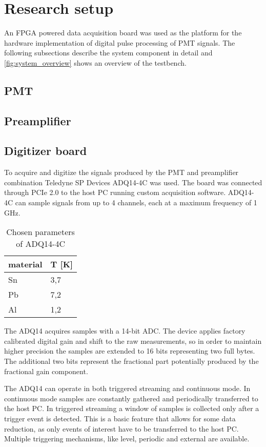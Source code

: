 \section{Research setup}
An FPGA powered data acquisition board was used as the platform 
for the hardware implementation of digital pulse processing of PMT
signals.
The following subsections describe the system component in detail and
\autoref{fig:system_overview} shows an overview of the testbench.
\subsection{PMT}
\subsection{Preamplifier}
\subsection{Digitizer board}
To acquire and digitize the signals produced by the PMT and preamplifier
combination Teledyne SP Devices ADQ14-4C was used. The board was connected
through PCIe 2.0 to the host PC running custom acquisition software.
ADQ14-4C can sample signals from up to 4 channels, each at a maximum
frequency of 1 GHz. 
\begin{table}[H]
\caption{Chosen parameters of ADQ14-4C}
\centering
  \begin{tabular}{l l}
    material  & T [K]\\
    \hline
    Sn                     & 3,7 \\
    Pb                     & 7,2 \\
    Al                     & 1,2\\
  \end{tabular}
  \label{tab:adq14_datasheet}
\end{table}


The ADQ14 acquires samples with a 14-bit ADC.
The device applies factory calibrated digital gain and shift
to the raw measurements, 
so in order to maintain higher precision the samples are 
extended to 16 bits representing two full bytes. 
The additional two bits represent the fractional part potentially
produced by the fractional gain component.


The ADQ14 can operate in both triggered streaming and continuous mode.
In continuous mode samples are constantly gathered and periodically
transferred to the host PC. In triggered streaming a window of samples is 
collected only after a trigger event is detected. This is a basic feature
that allows for some data reduction, as only events of interest have to
be transferred to the host PC. Multiple triggering mechanisms, 
like level, periodic and external are available.


